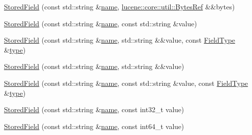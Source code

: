 \begin{DoxyCompactItemize}
\mbox{\hyperlink{classlucene_1_1core_1_1document_1_1StoredField_a12f49339f0b54b01c39e76ac3e0d2505}{Stored\+Field}} (const std\+::string \&\mbox{\hyperlink{classlucene_1_1core_1_1document_1_1Field_a52f673f3b3abb14b180f5159f4726537}{name}}, \mbox{\hyperlink{classlucene_1_1core_1_1util_1_1BytesRef}{lucene\+::core\+::util\+::\+Bytes\+Ref}} \&\&bytes)
\item 
\mbox{\hyperlink{classlucene_1_1core_1_1document_1_1StoredField_a5e25067eaededa0d8e670e23e276dc4d}{Stored\+Field}} (const std\+::string \&\mbox{\hyperlink{classlucene_1_1core_1_1document_1_1Field_a52f673f3b3abb14b180f5159f4726537}{name}}, const std\+::string \&value)
\item 
\mbox{\hyperlink{classlucene_1_1core_1_1document_1_1StoredField_ac8b65bd52522afed3a0b761dde2d04ca}{Stored\+Field}} (const std\+::string \&\mbox{\hyperlink{classlucene_1_1core_1_1document_1_1Field_a52f673f3b3abb14b180f5159f4726537}{name}}, std\+::string \&\&value, const \mbox{\hyperlink{classlucene_1_1core_1_1document_1_1FieldType}{Field\+Type}} \&\mbox{\hyperlink{classlucene_1_1core_1_1document_1_1Field_a7d5849d933ebde73422710069643ccff}{type}})
\item 
\mbox{\hyperlink{classlucene_1_1core_1_1document_1_1StoredField_af384294458d9e224ff6a056188513245}{Stored\+Field}} (const std\+::string \&\mbox{\hyperlink{classlucene_1_1core_1_1document_1_1Field_a52f673f3b3abb14b180f5159f4726537}{name}}, std\+::string \&\&value)
\item 
\mbox{\hyperlink{classlucene_1_1core_1_1document_1_1StoredField_a334a4af15ae22b1036fb2b799e7f2f7d}{Stored\+Field}} (const std\+::string \&\mbox{\hyperlink{classlucene_1_1core_1_1document_1_1Field_a52f673f3b3abb14b180f5159f4726537}{name}}, const std\+::string \&value, const \mbox{\hyperlink{classlucene_1_1core_1_1document_1_1FieldType}{Field\+Type}} \&\mbox{\hyperlink{classlucene_1_1core_1_1document_1_1Field_a7d5849d933ebde73422710069643ccff}{type}})
\item 
\mbox{\hyperlink{classlucene_1_1core_1_1document_1_1StoredField_a08a6abb7990132374c1f711a39f2e7f8}{Stored\+Field}} (const std\+::string \&\mbox{\hyperlink{classlucene_1_1core_1_1document_1_1Field_a52f673f3b3abb14b180f5159f4726537}{name}}, const int32\+\_\+t value)
\item 
\mbox{\hyperlink{classlucene_1_1core_1_1document_1_1StoredField_aa847b5a329232f0023f6ef152d4baea1}{Stored\+Field}} (const std\+::string \&\mbox{\hyperlink{classlucene_1_1core_1_1document_1_1Field_a52f673f3b3abb14b180f5159f4726537}{name}}, const int64\+\_\+t value)
\item 

\end{DoxyCompactItemize}
